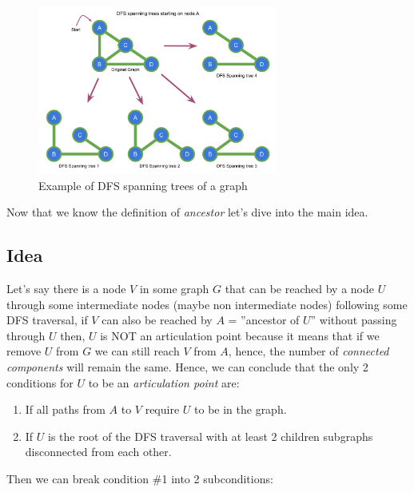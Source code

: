 \documentclass[twoside, openany]{book}
\begin{document}
\begin{figure}[H]
  \centering
  \includegraphics[width=0.7\textwidth]{"Images/Graph Theory/Articulation Points And Bridges/g2.pdf"}
  \caption{Example of DFS spanning trees of a graph}
  \label{fig:apb_g2}
\end{figure}


Now that we know the definition of \textit{ancestor} let's dive into the main idea.

\subsection*{Idea}

Let's say there is a node $V$ in some graph $G$ that can be reached by a node $U$ through some
intermediate nodes (maybe non intermediate nodes) following some DFS traversal, if $V$ can also be
reached by $A$ = ''ancestor of $U$'' without passing through $U$ then, $U$ is NOT an articulation point
because it means that if we remove $U$ from $G$ we can still reach $V$ from $A$, hence, the number of
\textit{connected components} will remain the same. Hence, we can conclude that the only 2 conditions for
$U$ to be an \textit{articulation point} are:

\begin{enumerate}
  \item If all paths from $A$ to $V$ require $U$ to be in the graph.
  \item If $U$ is the root of the DFS traversal with at least 2 children subgraphs disconnected from each other.
\end{enumerate}

\noindent
Then we can break condition \#1 into 2 subconditions:
\end{document}

